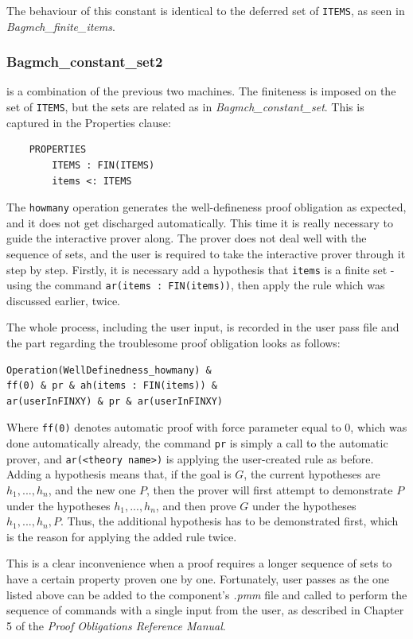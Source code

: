 \documentclass[12pt,journal,duplex]{IEEEtran}
\begin{document}
	The behaviour of this constant is identical to the deferred set of \texttt{ITEMS}, as seen in \emph{Bagmch\_finite\_items}.

	\subsubsection{Bagmch\_constant\_set2} is a combination of the previous two machines. The finiteness is imposed on the set of \texttt{ITEMS}, but the sets are related as in \emph{Bagmch\_constant\_set}. This is captured in the Properties clause:
	\begin{lstlisting}
	PROPERTIES
		ITEMS : FIN(ITEMS)
		items <: ITEMS
	\end{lstlisting}
	The \texttt{howmany} operation generates the well-defineness proof obligation as expected, and it does not get discharged automatically. This time it is really necessary to guide the interactive prover along. The prover does not deal well with the sequence of sets, and the user is required to take the interactive prover through it step by step. Firstly, it is necessary add a hypothesis that \texttt{items} is a finite set - using the command \texttt{ar(items : FIN(items))}, then apply the rule which was discussed earlier, twice.

	The whole process, including the user input, is recorded in the user pass file and the part regarding the troublesome proof obligation looks as follows:

	\begin{lstlisting}
Operation(WellDefinedness_howmany) &
ff(0) & pr & ah(items : FIN(items)) &
ar(userInFINXY) & pr & ar(userInFINXY)
	\end{lstlisting}
	Where \texttt{ff(0)} denotes automatic proof with force parameter equal to 0, which was done automatically already, the command \texttt{pr} is simply a call to the automatic prover, and \texttt{ar(<theory name>)} is applying the user-created rule as before. Adding a hypothesis means that, if the goal is $G$, the current hypotheses are $h_1, ..., h_n$, and the new one $P$, then the prover will first attempt to demonstrate $P$ under the hypotheses $h_1, ..., h_n$, and then prove $G$ under the hypotheses $h_1, ...,h_n, P$.\cite{PO reference}  Thus, the additional hypothesis has to be demonstrated first, which is the reason for applying the added rule twice.

	This is a clear inconvenience when a proof requires a longer sequence of sets to have a certain property proven one by one. Fortunately, user passes as the one listed above can be added to the component's \emph{.pmm} file and called to perform the sequence of commands with a single input from the user, as described in Chapter 5 of the \emph{Proof Obligations Reference Manual}.
\end{document}
